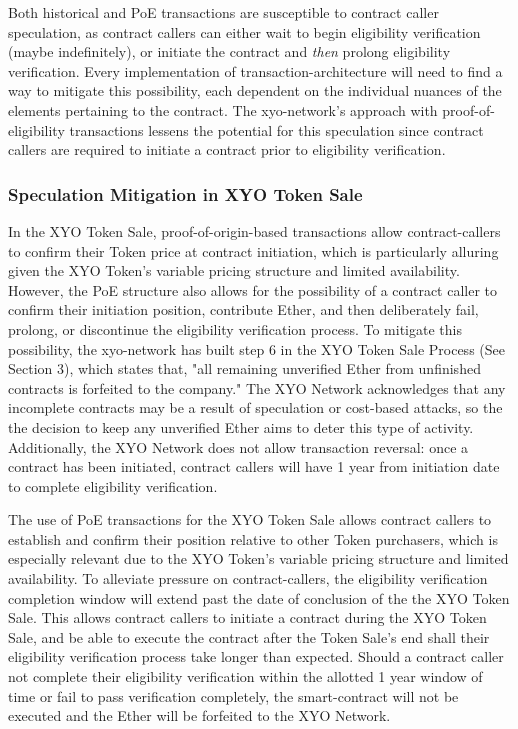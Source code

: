 \documentclass{article}
\begin{document}
Both historical and PoE \glspl{transaction} are susceptible to contract caller speculation, as contract callers can either wait to begin eligibility verification (maybe indefinitely), or initiate the contract and \textit{then} prolong eligibility verification. Every implementation of \gls{transaction-architecture} will need to find a way to mitigate this possibility, each dependent on the individual nuances of the elements pertaining to the contract. The \Gls{xyo-network}'s approach with \Gls{proof-of-eligibility} transactions lessens the potential for this speculation since contract callers are required to initiate a contract prior to eligibility verification. 

\subsubsection{Speculation Mitigation in XYO Token Sale}
In the XYO Token Sale, \Gls{proof-of-origin}-based transactions allow \glspl{contract-caller} to confirm their Token price at contract initiation, which is particularly alluring given the XYO Token's variable pricing structure and limited availability. However, the PoE structure also allows for the possibility of a contract caller to confirm their initiation position, contribute Ether, and then deliberately fail, prolong, or discontinue the eligibility verification process. To mitigate this possibility, the \Gls{xyo-network} has built step 6 in the XYO Token Sale Process (See Section 3), which states that, "all remaining unverified Ether from unfinished contracts is forfeited to the company." The XYO Network acknowledges that any incomplete contracts may be a result of speculation or cost-based attacks, so the the decision to keep any unverified Ether aims to deter this type of activity. Additionally, the XYO Network does not allow transaction reversal: once a contract has been initiated, contract callers will have 1 year from initiation date to complete eligibility verification.

The use of PoE transactions for the XYO Token Sale allows contract callers to establish and confirm their position relative to other Token purchasers, which is especially relevant due to the XYO Token's variable pricing structure and limited availability. To alleviate pressure on contract-callers, the eligibility verification completion window will extend past the date of conclusion of the the XYO Token Sale.  This allows contract callers to initiate a contract during the XYO Token Sale, and be able to execute the contract after the Token Sale's end shall their eligibility verification process take longer than expected. Should a contract caller not complete their eligibility verification within the allotted 1 year window of time or fail to pass verification completely, the \gls{smart-contract} will not be executed and the Ether will be forfeited to the XYO Network.
\end{document}
